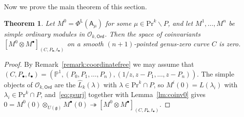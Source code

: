 \documentclass[12pt,a4paper,reqno]{amsart}
\numberwithin{equation}{section}
\newtheorem{theorem}{Theorem}[section]
\theoremstyle{definition}
\newcommand{\g}{\mathfrak{g}}
\renewcommand{\P}{\mathbb{P}}
\def\O{\mathcal{O}}
\def\Ord{\mathsf{Ord}}
\def\L{\mathsf{L}}
\def\Pr{\mathrm{Pr}}
\def\la{\lambda}
\def\bs{\backslash}
\def\o{\otimes}
\def\ds{\dots}
\def\A{\mathsf{A}}
\begin{document}
Now we prove the main theorem of this section.

\begin{theorem}\label{thm:fusion_closedness}
Let $M^0=\Phi^\L(\A_\mu)$ for some $\mu\in \Pr^k\bs P$, and let $M^1,\ds,M^n$ be simple ordinary modules in $\O_{k,\Ord}$. Then the space of coinvariants $[M^0\o M^\bullet]_{(C,P_\bullet,t_\bullet)}$ on a smooth $(n+1)$-pointed genus-zero curve $C$ is zero.
\end{theorem}
\begin{proof}
By Remark~\ref{remark:coordinatefree} we may assume that $(C,P_\bullet,t_\bullet)=(\P^1,(P_0,P_1,\ds, P_n),(1/z,z-P_1,\ds,z-P_n))$. The simple objects of $\O_{k,\Ord}$ are the $\hat{L}_k(\la)$ with $\la\in \Pr^k\cap P$, so $M^i(0)=L(\la_i)$ with $\la_i\in\Pr^k\cap P$, and~\eqref{eq:gsurj} together with Lemma~\ref{lm:coinv0} gives
$
0=M^0(0)\o_{U(\g)} M^\bullet(0)\twoheadrightarrow [M^0\o M^\bullet]_{(C,P_\bullet,t_\bullet)}.
$
\end{proof}
\end{document}
